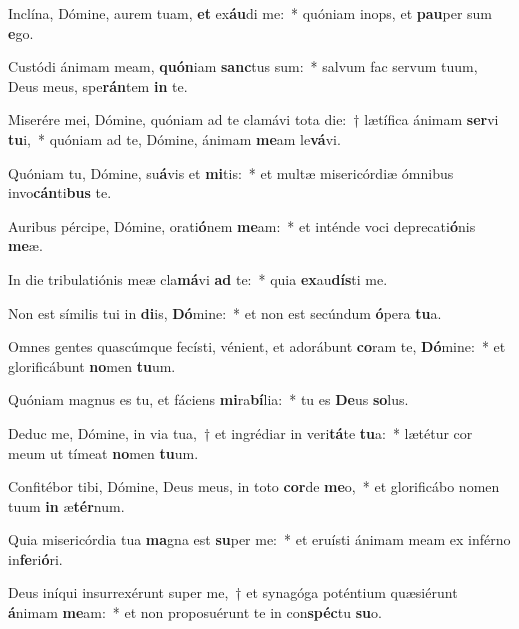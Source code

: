 \item Inclína, Dómine, aurem tuam, \textbf{et} ex\textbf{áu}di me:~* quóniam inops, et \textbf{pau}per sum \textbf{e}go.

\item Custódi ánimam meam, \textbf{quón}iam \textbf{sanc}tus sum:~* salvum fac servum tuum, Deus meus, spe\textbf{rán}tem \textbf{in} te.

\item Miserére mei, Dómine, quóniam ad te clamávi tota die:~† lætífica ánimam \textbf{ser}vi \textbf{tu}i,~* quóniam ad te, Dómine, ánimam \textbf{me}am le\textbf{vá}vi.

\item Quóniam tu, Dómine, su\textbf{á}vis et \textbf{mi}tis:~* et multæ misericórdiæ ómnibus invo\textbf{cán}ti\textbf{bus} te.

\item Auribus pércipe, Dómine, orati\textbf{ó}nem \textbf{me}am:~* et inténde voci deprecati\textbf{ó}nis \textbf{me}æ.

\item In die tribulatiónis meæ cla\textbf{má}vi \textbf{ad} te:~* quia \textbf{ex}au\textbf{dís}ti me.

\item Non est símilis tui in \textbf{di}is, \textbf{Dó}mine:~* et non est secúndum \textbf{ó}pera \textbf{tu}a.

\item Omnes gentes quascúmque fecísti, vénient, et adorábunt \textbf{co}ram te, \textbf{Dó}mine:~* et glorificábunt \textbf{no}men \textbf{tu}um.

\item Quóniam magnus es tu, et fáciens \textbf{mi}ra\textbf{bí}lia:~* tu es \textbf{De}us \textbf{so}lus.

\item Deduc me, Dómine, in via tua,~† et ingrédiar in veri\textbf{tá}te \textbf{tu}a:~* lætétur cor meum ut tímeat \textbf{no}men \textbf{tu}um.

\item Confitébor tibi, Dómine, Deus meus, in toto \textbf{cor}de \textbf{me}o,~* et glorificábo nomen tuum \textbf{in} æ\textbf{tér}num.

\item Quia misericórdia tua \textbf{ma}gna est \textbf{su}per me:~* et eruísti ánimam meam ex inférno in\textbf{fe}ri\textbf{ó}ri.

\item Deus iníqui insurrexérunt super me,~† et synagóga poténtium quæsiérunt \textbf{á}nimam \textbf{me}am:~* et non proposuérunt te in con\textbf{spéc}tu \textbf{su}o.

